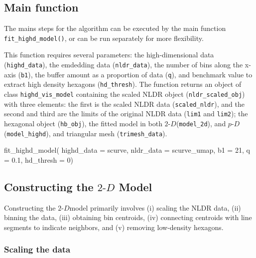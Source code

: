 \documentclass[
  11pt,
  a4paper,
]{report}
\newenvironment{Shaded}{\begin{snugshade}}{\end{snugshade}}
\newcommand{\AttributeTok}[1]{\textcolor[rgb]{0.40,0.45,0.13}{#1}}
\newcommand{\DecValTok}[1]{\textcolor[rgb]{0.68,0.00,0.00}{#1}}
\newcommand{\FloatTok}[1]{\textcolor[rgb]{0.68,0.00,0.00}{#1}}
\newcommand{\FunctionTok}[1]{\textcolor[rgb]{0.28,0.35,0.67}{#1}}
\newcommand{\NormalTok}[1]{\textcolor[rgb]{0.00,0.23,0.31}{#1}}
\newcommand\pD{$p\text{-}D$}
\newcommand{\twoD}{$2\text{-}D$}
\begin{document}
\subsection{Main function}\label{main-function}

The mains steps for the algorithm can be executed by the main function
\texttt{fit\_highd\_model()}, or can be run separately for more
flexibility.

This function requires several parameters: the high-dimensional data
(\texttt{highd\_data}), the emdedding data (\texttt{nldr\_data}), the
number of bins along the x-axis (\texttt{b1}), the buffer amount as a
proportion of data (\texttt{q}), and benchmark value to extract high
density hexagons (\texttt{hd\_thresh}). The function returns an object
of class \texttt{highd\_vis\_model} containing the scaled NLDR object
(\texttt{nldr\_scaled\_obj}) with three elements: the first is the
scaled NLDR data (\texttt{scaled\_nldr}), and the second and third are
the limits of the original NLDR data (\texttt{lim1} and \texttt{lim2});
the hexagonal object (\texttt{hb\_obj}), the fitted model in both
\twoD (\texttt{model\_2d}), and \pD (\texttt{model\_highd}), and
triangular mesh (\texttt{trimesh\_data}).

\begin{Shaded}
\begin{Highlighting}[]
\FunctionTok{fit\_highd\_model}\NormalTok{(}
  \AttributeTok{highd\_data =}\NormalTok{ scurve, }
  \AttributeTok{nldr\_data =}\NormalTok{ scurve\_umap, }
  \AttributeTok{b1 =} \DecValTok{21}\NormalTok{, }
  \AttributeTok{q =} \FloatTok{0.1}\NormalTok{, }
  \AttributeTok{hd\_thresh =} \DecValTok{0}\NormalTok{)}
\end{Highlighting}
\end{Shaded}

\subsection{\texorpdfstring{Constructing the \(2\text{-}D\)
Model}{Constructing the 2\textbackslash text\{-\}D Model}}\label{constructing-the-2text-d-model}

Constructing the \twoD model primarily involves (i) scaling the NLDR
data, (ii) binning the data, (iii) obtaining bin centroids, (iv)
connecting centroids with line segments to indicate neighbors, and (v)
removing low-density hexagons.

\subsubsection{Scaling the data}\label{scaling-the-data}
\end{document}
